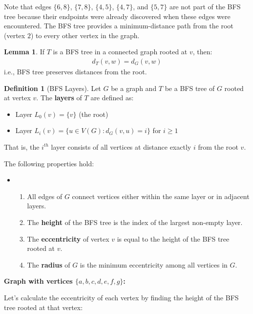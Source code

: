 \documentclass{article}
\theoremstyle{definition}
\newtheorem{lemma}{Lemma}
\newtheorem{definition}{Definition}
\begin{document}
Note that edges $\{6, 8\}$, $\{7, 8\}$, $\{4, 5\}$, $\{4, 7\}$, and $\{5, 7\}$ are not 
part of the BFS tree because their endpoints were already discovered when these edges 
were encountered. The BFS tree provides a minimum-distance path from the root 
(vertex $2$) to every other vertex in the graph.

\pagebreak


\begin{lemma}
If $T$ is a BFS tree in a connected graph rooted at $v$, then:
\begin{align*}
d_T(v, w) = d_G(v, w)
\end{align*}
i.e., BFS tree preserves distances from the root.
\end{lemma}

\begin{definition}[BFS Layers]
Let $G$ be a graph and $T$ be a BFS tree of $G$ rooted at vertex $v$. The \textbf{layers} of $T$ are defined as:
\begin{itemize}
\item Layer $L_0(v) = \{v\}$ (the root)
\item Layer $L_i(v) = \{u \in V(G) : d_G(v,u) = i\}$ for $i \geq 1$
\end{itemize}

That is, the $i^{th}$ layer consists of all vertices at distance exactly $i$ from the root $v$.

The following properties hold:
\begin{itemize}
\item[] \begin{enumerate}
    \item All edges of $G$ connect vertices either within the same layer or in adjacent layers.
    \item The \textbf{height} of the BFS tree is the index of the largest non-empty layer.
    \item The \textbf{eccentricity} of vertex $v$ is equal to the height of the BFS tree rooted at $v$.
    \item The \textbf{radius} of $G$ is the minimum eccentricity among all vertices in $G$.
    \end{enumerate}
\end{itemize}
\end{definition}

\noindent\textbf{Graph with vertices $\{a, b, c, d, e, f, g\}$:}

Let's calculate the eccentricity of each vertex by finding the height of the BFS tree rooted at that vertex:
\end{document}
